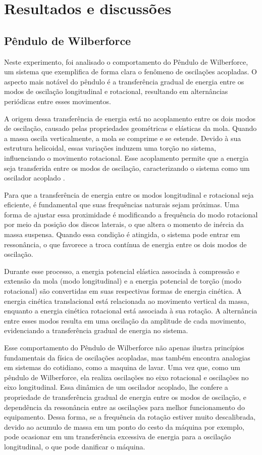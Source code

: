 \section{Resultados e discussões}
\subsection{Pêndulo de Wilberforce}
Neste experimento, foi analisado o comportamento do Pêndulo de Wilberforce, um sistema que exemplifica de forma clara o fenômeno de oscilações acopladas. O aspecto mais notável do pêndulo é a transferência gradual de energia entre os modos de oscilação longitudinal e rotacional, resultando em alternâncias periódicas entre esses movimentos.

A origem dessa transferência de energia está no acoplamento entre os dois modos de oscilação, causado pelas propriedades geométricas e elásticas da mola. Quando a massa oscila verticalmente, a mola se comprime e se estende. Devido à sua estrutura helicoidal, essas variações induzem uma torção no sistema, influenciando o movimento rotacional. Esse acoplamento permite que a energia seja transferida entre os modos de oscilação, caracterizando o sistema como um oscilador acoplado .

Para que a transferência de energia entre os modos longitudinal e rotacional seja eficiente, é fundamental que suas frequências naturais sejam próximas. Uma forma de ajustar essa proximidade é modificando a frequência do modo rotacional por meio da posição dos discos laterais, o que altera o momento de inércia da massa suspensa. Quando essa condição é atingida, o sistema pode entrar em ressonância, o que favorece a troca contínua de energia entre os dois modos de oscilação.

Durante esse processo, a energia potencial elástica associada à compressão e extensão da mola (modo longitudinal) e a energia potencial de torção (modo rotacional) são convertidas em suas respectivas formas de energia cinética. A energia cinética translacional está relacionada ao movimento vertical da massa, enquanto a energia cinética rotacional está associada à sua rotação. A alternância entre esses modos resulta em uma oscilação da amplitude de cada movimento, evidenciando a transferência gradual de energia no sistema.

Esse comportamento do Pêndulo de Wilberforce não apenas ilustra princípios fundamentais da física de oscilações acopladas, mas também encontra analogias em sistemas do cotidiano, como a maquina de lavar. Uma vez que, como um pêndulo de Wilberforce, ela realiza oscilações no 
eixo rotacional e oscilações no eixo longitudinal. Essa dinâmica de um oscilador acoplado, lhe confere a propriedade de transferência 
gradual de energia entre os modos de oscilação, e dependência da ressonância entre as oscilações para melhor funcionamento do equipamento.
Dessa forma, se a frequência da rotação estiver muito descalibrada, devido ao acumulo de massa em um ponto do cesto da máquina por exemplo,
pode ocasionar em um transferência excessiva de energia para a oscilação longitudinal, o que pode danificar o máquina.

